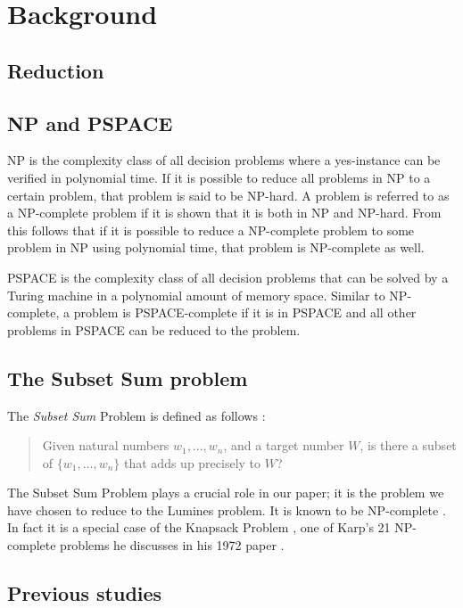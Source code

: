 \section{Background}

\subsection{Reduction}

\subsection{NP and PSPACE}
NP is the complexity class of all decision problems where a yes-instance can be verified in polynomial time. If it is possible to reduce all problems in NP to a certain problem, that problem is said to be NP-hard. A problem is referred to as a NP-complete problem if it is shown that it is both in NP and NP-hard. From this follows that if it is possible to reduce a NP-complete problem to some problem in NP using polynomial time, that problem is NP-complete as well.

PSPACE is the complexity class of all decision problems that can be solved by a Turing machine in a polynomial amount of memory space. Similar to NP-complete, a problem is PSPACE-complete if it is in PSPACE and all other problems in PSPACE can be reduced to the problem.

\subsection{The Subset Sum problem}

The \textit{Subset Sum} Problem is defined as follows \cite[p.~491]{algorithm}:

\begin{quote}
Given natural numbers $w_1, \ldots, w_n$, and a target number $W$, is there a subset of $\{w_1, \ldots, w_n \}$ that adds up precisely to $W$?
\end{quote}

The Subset Sum Problem plays a crucial role in our paper; it is the problem we have chosen to reduce to the Lumines problem. It is known to be NP-complete \cite[p.~492]{algorithm}. In fact it is a special case of the Knapsack Problem \cite[p.~491]{algorithm}, one of Karp's 21 NP-complete problems he discusses in his 1972 paper \cite{karp}.

\subsection{Previous studies}

